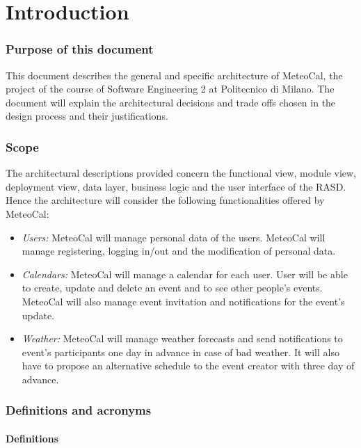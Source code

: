 \documentclass[10pt,a4paper,titlepage]{article}
\begin{document}


\part{Introduction}
\label{part:introduction}

\section{Purpose of this document}
This document describes the general and specific architecture of MeteoCal, the project of the course of Software Engineering 2 at Politecnico di Milano.
The document will explain the architectural decisions and trade offs chosen in the design process and their justifications.

\section{Scope}
The architectural descriptions provided concern the functional view, module view, deployment view, data layer, business logic and the user interface of the RASD.
Hence the architecture will consider the following functionalities offered by MeteoCal:

\begin{itemize}
\item \emph{Users:} MeteoCal will manage personal data of the users. MeteoCal will manage registering, logging in/out and the modification of personal data.

\item \emph{Calendars:} MeteoCal will manage a calendar for each user. User will be able to create, update and delete an event and to see other people's events. MeteoCal will also manage event invitation and notifications for the event's update.

\item \emph{Weather:} MeteoCal will manage weather forecasts and send notifications to event's participants one day in advance in case of bad weather. It will also have to propose an alternative schedule to the event creator with three day of advance.
\end{itemize}

\section{Definitions and acronyms}

\subsection{Definitions}
\end{document}
